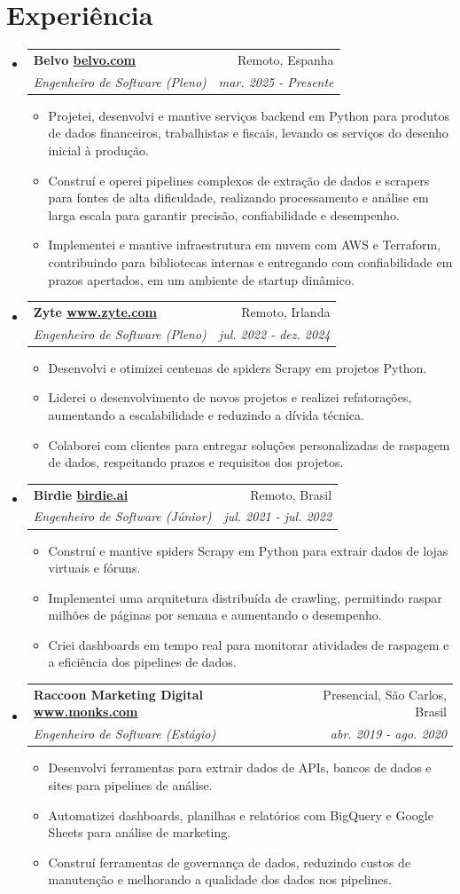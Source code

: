 \documentclass[letterpaper,11pt]{article}
\makeatletter
\newcommand{\resumeItemNoTitle}[1]{
    \item\small{
        {#1 \vspace{-2pt}}
    }
}
\newcommand{\resumeSubheading}[4]{
  \vspace{-1pt}\item
    \begin{tabular*}{0.97\textwidth}[t]{l@{\extracolsep{\fill}}r}
      \textbf{#1} & #2 \\
      \textit{\small#3} & \textit{\small #4} \\
    \end{tabular*}\vspace{-5pt}
}
\newcommand{\resumeSubHeadingListStart}{\begin{itemize}[leftmargin=*]}
\newcommand{\resumeSubHeadingListEnd}{\end{itemize}}
\newcommand{\resumeItemListStart}{\begin{itemize}[leftmargin=*]\setlength\itemsep{1mm}}
\newcommand{\resumeItemListEnd}{\end{itemize}\vspace{-5pt}}
\makeatother
\begin{document}
\section{Experiência}
  \resumeSubHeadingListStart
  \resumeSubheading
      {Belvo \href{https://belvo.com/}{belvo.com}}{Remoto, Espanha}
      {Engenheiro de Software (Pleno)}{mar. 2025 - Presente}
      \resumeItemListStart
        \resumeItemNoTitle
            {Projetei, desenvolvi e mantive serviços backend em Python para produtos de dados financeiros, trabalhistas e fiscais, levando os serviços do desenho inicial à produção.}
        \resumeItemNoTitle
            {Construí e operei pipelines complexos de extração de dados e scrapers para fontes de alta dificuldade, realizando processamento e análise em larga escala para garantir precisão, confiabilidade e desempenho.}
        \resumeItemNoTitle
            {Implementei e mantive infraestrutura em nuvem com AWS e Terraform, contribuindo para bibliotecas internas e entregando com confiabilidade em prazos apertados, em um ambiente de startup dinâmico.}
      \resumeItemListEnd
  \resumeSubheading
      {Zyte \href{https://www.zyte.com/}{www.zyte.com}}{Remoto, Irlanda}
      {Engenheiro de Software (Pleno)}{jul. 2022 - dez. 2024}
      \resumeItemListStart
        \resumeItemNoTitle
            {Desenvolvi e otimizei centenas de spiders Scrapy em projetos Python.}
        \resumeItemNoTitle
            {Liderei o desenvolvimento de novos projetos e realizei refatorações, aumentando a escalabilidade e reduzindo a dívida técnica.}
        \resumeItemNoTitle
            {Colaborei com clientes para entregar soluções personalizadas de raspagem de dados, respeitando prazos e requisitos dos projetos.}
      \resumeItemListEnd
  \resumeSubheading
      {Birdie \href{https://birdie.ai/}{birdie.ai}}{Remoto, Brasil}
      {Engenheiro de Software (Júnior)}{jul. 2021 - jul. 2022}
      \resumeItemListStart
        \resumeItemNoTitle
            {Construí e mantive spiders Scrapy em Python para extrair dados de lojas virtuais e fóruns.}
        \resumeItemNoTitle
            {Implementei uma arquitetura distribuída de crawling, permitindo raspar milhões de páginas por semana e aumentando o desempenho.}
        \resumeItemNoTitle
            {Criei dashboards em tempo real para monitorar atividades de raspagem e a eficiência dos pipelines de dados.}
      \resumeItemListEnd
  \resumeSubheading
      {Raccoon Marketing Digital \href{https://www.monks.com/}{www.monks.com}}{Presencial, São Carlos, Brasil}
      {Engenheiro de Software (Estágio)}{abr. 2019 - ago. 2020}
      \resumeItemListStart
        \resumeItemNoTitle
            {Desenvolvi ferramentas para extrair dados de APIs, bancos de dados e sites para pipelines de análise.}
        \resumeItemNoTitle
            {Automatizei dashboards, planilhas e relatórios com BigQuery e Google Sheets para análise de marketing.}
        \resumeItemNoTitle
            {Construí ferramentas de governança de dados, reduzindo custos de manutenção e melhorando a qualidade dos dados nos pipelines.}
      \resumeItemListEnd
  \resumeSubHeadingListEnd
  
\end{document}
